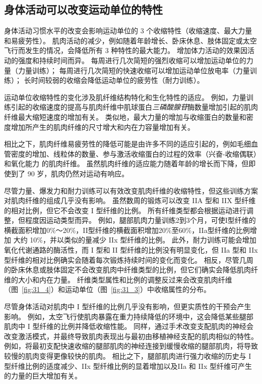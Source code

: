 \subsection{身体活动可以改变运动单位的特性}

身体活动习惯水平的改变会影响运动单位的 3 个收缩特性（收缩速度、最大力量和易疲劳性）。
肌肉活动的减少，例如随着年龄增长、卧床休息、肢体固定或太空飞行而发生的情况，会降低所有 3 种特性的最大能力。
增加体力活动的效果因活动的强度和持续时间而异。
每周进行几次简短的强烈收缩可以增加运动单位的力量（力量训练）；
每周进行几次简短的快速收缩可以增加运动单位放电率（力量训练）；
长时间较弱的收缩会降低运动单位的疲劳性（耐力训练）。


运动单位收缩特性的变化涉及肌纤维结构特化和生化特性的适应。
例如，力量训练引起的收缩速度的提高与肌肉纤维中肌球蛋白\textit{三磷酸腺苷}酶数量增加引起的肌肉纤维最大缩短速度的增加有关。
类似地，最大力量的增加与收缩蛋白的数量和密度增加所产生的肌肉纤维的尺寸增大和内在力容量增加有关。


相比之下，肌肉纤维易疲劳性的降低可能是由许多不同的适应引起的，例如毛细血管密度的增加、线粒体的数量、参与激活收缩蛋白的过程的效率（兴奋-收缩偶联）和氧化能力 的肌肉纤维。
虽然肌肉纤维的适应能力随着年龄的增长而下降，但即使到了 90 岁，肌肉仍然对运动有响应。


尽管力量、爆发力和耐力训练可以有效改变肌肉纤维的收缩特性，但这些训练方案对肌肉纤维的组成几乎没有影响。
虽然数周的锻炼可以改变 IIA 型和 IIX 型纤维的相对比例，但它不会改变 I 型纤维的比例。
所有纤维类型都会根据运动进行调整，但程度因运动类型而异。
例如，腿部肌肉力量训练2到3个月，可使I型纤维的横截面积增加0\%～20\%，II型纤维的横截面积增加20\%至60\%，IIa型纤维的比例增加 大约 10\%，并以类似的量减少 IIx 型纤维的比例。
此外，耐力训练可能会增加氧化代谢通路的酶活性，而 I 型和 II 型纤维的比例没有明显变化，但 IIa 型和 IIx 型纤维的相对比例确实会随着每次锻炼持续时间的变化而变化。
相反，尽管几周的卧床休息或肢体固定不会改变肌肉中纤维类型的比例，但它们确实会降低肌肉纤维的大小和内在力量。
纤维类型属性和比例的调整反过来会改变肌肉纤维（图~\ref{fig:31_4}）和运动单位（图~\ref{fig:31_3}）中收缩属性的分布。


尽管身体活动对肌肉中 I 型纤维的比例几乎没有影响，但更实质性的干预会产生影响。
例如，太空飞行使肌肉暴露在重力持续降低的环境中，这会降低某些腿部肌肉中 I 型纤维的比例并降低收缩性能。
同样，通过手术改变支配肌肉的神经会改变激活模式，并最终导致肌肉表现出与最初由移植神经支配的肌肉相似的特性。
例如，将最初支配快速收缩的腿部肌肉的神经连接到缓慢收缩的腿部肌肉，将导致较慢的肌肉变得更像较快的肌肉。
相比之下，腿部肌肉进行强力收缩的历史与 I 型纤维比例的适度减少、IIx 型纤维比例的显着增加以及IIa 和 IIx 型纤维可产生的力量的巨大增加有关。 




